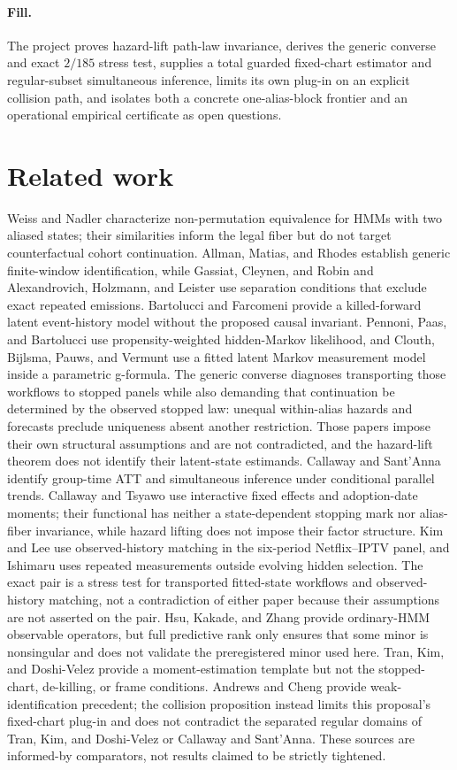 \documentclass{article}
\begin{document}
\paragraph{Fill.} The project proves hazard-lift path-law invariance, derives the generic converse and exact \(2/185\) stress test, supplies a total guarded fixed-chart estimator and regular-subset simultaneous inference, limits its own plug-in on an explicit collision path, and isolates both a concrete one-alias-block frontier and an operational empirical certificate as open questions.

\section{Related work}

Weiss and Nadler characterize non-permutation equivalence for HMMs with two aliased states; their similarities inform the legal fiber but do not target counterfactual cohort continuation. Allman, Matias, and Rhodes establish generic finite-window identification, while Gassiat, Cleynen, and Robin and Alexandrovich, Holzmann, and Leister use separation conditions that exclude exact repeated emissions. Bartolucci and Farcomeni provide a killed-forward latent event-history model without the proposed causal invariant. Pennoni, Paas, and Bartolucci use propensity-weighted hidden-Markov likelihood, and Clouth, Bijlsma, Pauws, and Vermunt use a fitted latent Markov measurement model inside a parametric g-formula. The generic converse diagnoses transporting those workflows to stopped panels while also demanding that continuation be determined by the observed stopped law: unequal within-alias hazards and forecasts preclude uniqueness absent another restriction. Those papers impose their own structural assumptions and are not contradicted, and the hazard-lift theorem does not identify their latent-state estimands. Callaway and Sant'Anna identify group-time ATT and simultaneous inference under conditional parallel trends. Callaway and Tsyawo use interactive fixed effects and adoption-date moments; their functional has neither a state-dependent stopping mark nor alias-fiber invariance, while hazard lifting does not impose their factor structure. Kim and Lee use observed-history matching in the six-period Netflix--IPTV panel, and Ishimaru uses repeated measurements outside evolving hidden selection. The exact pair is a stress test for transported fitted-state workflows and observed-history matching, not a contradiction of either paper because their assumptions are not asserted on the pair. Hsu, Kakade, and Zhang provide ordinary-HMM observable operators, but full predictive rank only ensures that some minor is nonsingular and does not validate the preregistered minor used here. Tran, Kim, and Doshi-Velez provide a moment-estimation template but not the stopped-chart, de-killing, or frame conditions. Andrews and Cheng provide weak-identification precedent; the collision proposition instead limits this proposal's fixed-chart plug-in and does not contradict the separated regular domains of Tran, Kim, and Doshi-Velez or Callaway and Sant'Anna. These sources are informed-by comparators, not results claimed to be strictly tightened.
\end{document}

